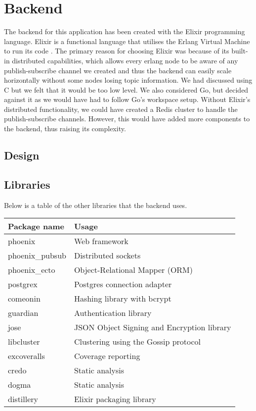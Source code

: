 \documentclass[11pt,a4paper]{report}
\begin{document}
\section{Backend}

The backend for this application has been created with the Elixir programming language. Elixir is a functional language that utilises the Erlang Virtual Machine to run its code \cite{website:elixir_homepage}. The primary reason for choosing Elixir was because of its built-in distributed capabilities, which allows every erlang node to be aware of any publish-subscribe channel we created and thus the backend can easily scale horizontally without some nodes losing topic information. We had discussed using C but we felt that it would be too low level. We also considered Go, but decided against it as we would have had to follow Go's workspace setup.  Without Elixir's distributed functionality, we could have created a Redis cluster to handle the publish-subscribe channels. However, this would have added more components to the backend, thus raising its complexity.


\subsection{Design}


\subsection{Libraries}

Below is a table of the other libraries that the backend uses.

\begin{tabular}{| l | l |}
  \hline
  Package name & Usage \\
  \hline
  phoenix & Web framework \\
  phoenix\_pubsub & Distributed sockets \\
  phoenix\_ecto & Object-Relational Mapper (ORM) \\
  \hline
  postgrex & Postgres connection adapter \\
  comeonin & Hashing library with bcrypt \\
  guardian & Authentication library \\
  jose & JSON Object Signing and Encryption library \\
  libcluster & Clustering using the Gossip protocol \\
  \hline
  excoveralls & Coverage reporting \\
  credo & Static analysis \\
  dogma & Static analysis \\
  distillery & Elixir packaging library \\
  \hline
\end{tabular}
\end{document}
